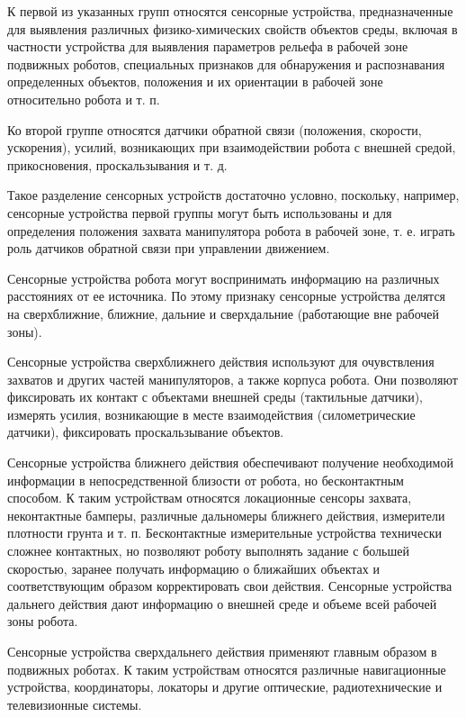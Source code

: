 К первой из указанных групп относятся сенсорные устройства, предназначенные для выявления различных физико-химических свойств объектов среды, включая в частности устройства для выявления параметров рельефа в рабочей зоне подвижных роботов, специальных признаков для обнаружения и распознавания определенных объектов, положения и их ориентации в рабочей зоне относительно робота и т. п.

Ко второй группе относятся датчики обратной связи (положения, скорости, ускорения), усилий, возникающих при взаимодействии робота с внешней средой, прикосновения, проскальзывания и т. д.

Такое разделение сенсорных устройств достаточно условно, поскольку, например, сенсорные устройства первой группы могут быть использованы и для определения положения захвата манипулятора робота в рабочей зоне, т. е. играть роль датчиков обратной связи при управлении движением.

Сенсорные устройства робота могут воспринимать информацию на различных расстояниях от ее источника. По этому признаку сенсорные устройства делятся на сверхближние, ближние, дальние и сверхдальние (работающие вне рабочей зоны).

Сенсорные устройства сверхближнего действия используют для очувствления захватов и других частей манипуляторов, а также корпуса робота. Они позволяют фиксировать их контакт с объектами внешней среды (тактильные датчики), измерять усилия, возникающие в месте взаимодействия (силометрические датчики), фиксировать проскальзывание объектов.

Сенсорные устройства ближнего действия обеспечивают получение необходимой информации в непосредственной близости от робота, но бесконтактным способом. К таким устройствам относятся локационные сенсоры захвата, неконтактные бамперы, различные дальномеры ближнего действия, измерители плотности грунта и т. п. Бесконтактные измерительные устройства технически сложнее контактных, но позволяют роботу выполнять задание с большей скоростью, заранее получать информацию о ближайших объектах и соответствующим образом корректировать свои действия.
Сенсорные устройства дальнего действия дают информацию о внешней среде и объеме всей рабочей зоны робота.

Сенсорные устройства сверхдальнего действия применяют главным образом в подвижных роботах. К таким устройствам относятся различные навигационные устройства, координаторы, локаторы и другие оптические, радиотехнические и телевизионные системы.

